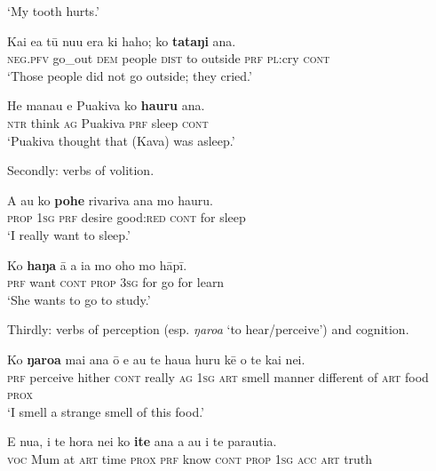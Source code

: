 \glt 
‘My tooth hurts.’ \textstyleExampleref{[R208.275]} 
\z

\ea\label{ex:7.66}
\gll Kai e{\ꞌ}a tū nu{\ꞌ}u era ki haho; ko \textbf{tataŋi} {\ꞌ}ana. \\
\textsc{neg.pfv} go\_out \textsc{dem} people \textsc{dist} to outside \textsc{prf} \textsc{pl}:cry \textsc{cont} \\

\glt 
‘Those people did not go outside; they cried.’ \textstyleExampleref{[R229.329]} 
\z

\ea\label{ex:7.67}
\gll He mana{\ꞌ}u e Puakiva ko \textbf{ha{\ꞌ}uru} {\ꞌ}ana. \\
\textsc{ntr} think \textsc{ag} Puakiva \textsc{prf} sleep \textsc{cont} \\

\glt 
‘Puakiva thought that (Kava) was asleep.’ \textstyleExampleref{[R229.292]} 
\z

Secondly: verbs of volition.

\ea\label{ex:7.68}
\gll A au ko \textbf{pohe} rivariva {\ꞌ}ana mo ha{\ꞌ}uru. \\
\textsc{prop} \textsc{1sg} \textsc{prf} desire good:\textsc{red} \textsc{cont} for sleep \\

\glt 
‘I really want to sleep.’ \textstyleExampleref{[R229.246]} 
\z

\ea\label{ex:7.69}
\gll Ko \textbf{haŋa} {\ꞌ}ā a ia mo oho mo hāpī.  \\
\textsc{prf} want \textsc{cont} \textsc{prop} \textsc{3sg} for go for learn  \\

\glt 
‘She wants to go to study.’ \textstyleExampleref{[R210.066]} 
\z

Thirdly: verbs of perception (esp. \textit{ŋaro{\ꞌ}a} ‘to hear/perceive’) and cognition.

\ea\label{ex:7.70}
\gll Ko \textbf{ŋaro{\ꞌ}a} mai {\ꞌ}ana {\ꞌ}ō e au te hau{\ꞌ}a huru kē  o te kai nei.\\
\textsc{prf} perceive hither \textsc{cont} really \textsc{ag} \textsc{1sg} \textsc{art} smell manner different  of \textsc{art} food \textsc{prox}\\

\glt 
‘I smell a strange smell of this food.’ \textstyleExampleref{[R236.026]} 
\z

\ea\label{ex:7.71}
\gll E nua, {\ꞌ}i te hora nei ko \textbf{{\ꞌ}ite} {\ꞌ}ana a au i te parauti{\ꞌ}a. \\
\textsc{voc} Mum at \textsc{art} time \textsc{prox} \textsc{prf} know \textsc{cont} \textsc{prop} \textsc{1sg} \textsc{acc} \textsc{art} truth \\

